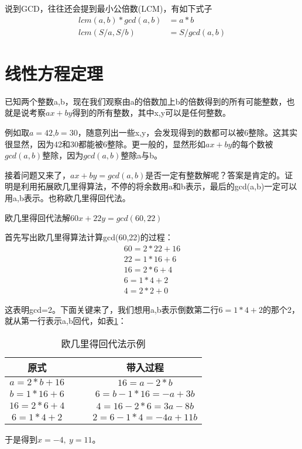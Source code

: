 

说到GCD，往往还会提到最小公倍数(LCM)，有如下式子
\begin{align*}
lcm(a,b) * gcd(a,b) &=a*b \\
lcm(S/a, S/b) &= S/gcd(a, b)
\end{align*}


\section{线性方程定理}

已知两个整数a,b，现在我们观察由a的倍数加上b的倍数得到的所有可能整数，也就是说{\heiti 考察$ax+by$得到的所有整数}，其中x,y可以是任何整数。

例如取$a=42$,$b=30$，随意列出一些x,y，会发现得到的数都可以被6整除。这其实很显然，因为42和30都能被6整除。更一般的，{\heiti 显然形如$ax+by$的每个数被$gcd(a,b)$整除}，因为$gcd(a,b)$整除a与b。

接着问题又来了，$ax+by=gcd(a,b)$是否一定有整数解呢？答案是肯定的。证明是利用{\heiti 拓展欧几里得算法}，不停的将余数用a和b表示，{\heiti 最后的gcd(a,b)一定可以用a,b表示}。也称欧几里得回代法。

\begin{example}
欧几里得回代法解$60x+22y=gcd(60,22)$

首先写出欧几里得算法计算gcd(60,22)的过程：
\begin{align*}
60=2 * 22+16 \\
22=1 * 16+6 \\
16=2 * 6+4 \\
6=1 * 4+2 \\
4=2 * 2+0
\end{align*}

这表明gcd=2。下面关键来了，我们想用a,b表示倒数第二行$6=1*4+2$的那个2，就从第一行表示a,b回代，如表\ref{tab:欧几里得回代法示例}：

\begin{table}[!htbp]
	\centering
	\caption{欧几里得回代法示例}
	\begin{tabular}{cccc}
		\toprule
		原式  && & 带入过程  \\
		\midrule
		$a=2*b+16$&&  & $16=a-2*b$ \\
		$b=1*16+6$&& & $6=b-1*16=-a+3b$ \\
		$16=2*6+4$&& &  $4=16-2*6=3a-8b$ \\
		$6=1*4+2$ && & $2=6-1*4=-4a+11b$ \\
		\bottomrule
	\end{tabular}%
	\label{tab:欧几里得回代法示例}
\end{table}%
	
于是得到$x=-4, \ y=11$。

\end{example}

